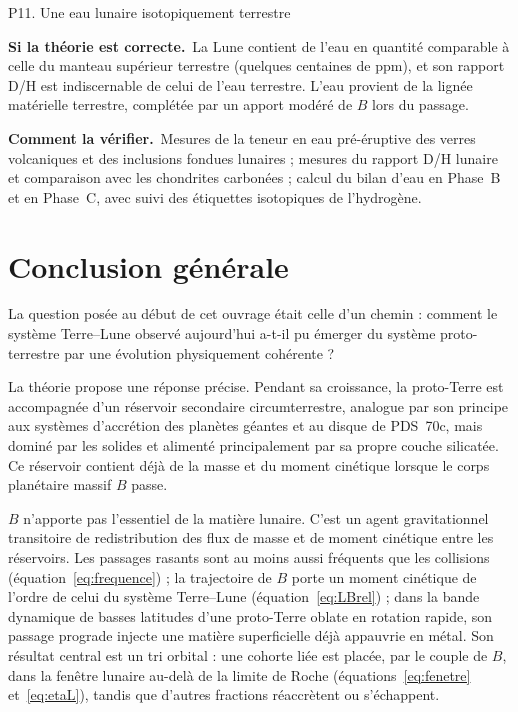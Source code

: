 \documentclass[11pt,a4paper,openany]{report}
\newcommand{\sila}{\par\noindent\textbf{Si la théorie est correcte.}\ }
\newcommand{\verif}{\par\smallskip\noindent\textbf{Comment la vérifier.}\ }
\begin{document}
\begin{prediction}{P11. Une eau lunaire isotopiquement terrestre}
\sila La Lune contient de l'eau en quantité comparable à celle du manteau supérieur terrestre
(quelques centaines de ppm), et son rapport D/H est indiscernable de celui de l'eau terrestre.
L'eau provient de la lignée matérielle terrestre, complétée par un apport modéré de $B$ lors du
passage.
\verif Mesures de la teneur en eau pré-éruptive des verres volcaniques et des inclusions fondues
lunaires \cite{Saal2008} ; mesures du rapport D/H lunaire et comparaison avec les chondrites
carbonées \cite{Saal2013} ; calcul du bilan d'eau en Phase~B et en Phase~C, avec suivi des
étiquettes isotopiques de l'hydrogène.
\end{prediction}

\chapter*{Conclusion générale}

La question posée au début de cet ouvrage était celle d'un chemin : comment le système
Terre--Lune observé aujourd'hui a-t-il pu émerger du système proto-terrestre par une évolution
physiquement cohérente ?

La théorie propose une réponse précise. Pendant sa croissance, la proto-Terre est accompagnée
d'un réservoir secondaire circumterrestre, analogue par son principe aux systèmes d'accrétion des
planètes géantes et au disque de PDS~70c, mais dominé par les solides et alimenté principalement
par sa propre couche silicatée. Ce réservoir contient déjà de la masse et du moment cinétique
lorsque le corps planétaire massif $B$ passe.

$B$ n'apporte pas l'essentiel de la matière lunaire. C'est un agent
gravitationnel transitoire de redistribution des flux de masse et de moment cinétique entre les
réservoirs. Les passages rasants sont au moins aussi fréquents que les collisions
(équation~\eqref{eq:frequence}) ; la trajectoire de $B$ porte un moment cinétique de l'ordre de celui
du système Terre--Lune (équation~\eqref{eq:LBrel}) ; dans la bande dynamique de basses latitudes d'une proto-Terre
oblate en rotation rapide, son passage prograde injecte une matière superficielle déjà appauvrie
en métal. Son résultat central est un tri orbital : une cohorte liée est placée, par le couple de $B$,
dans la fenêtre lunaire au-delà de la limite de Roche (équations~\eqref{eq:fenetre}
et~\eqref{eq:etaL}), tandis que d'autres fractions réaccrètent ou s'échappent.
\end{document}
